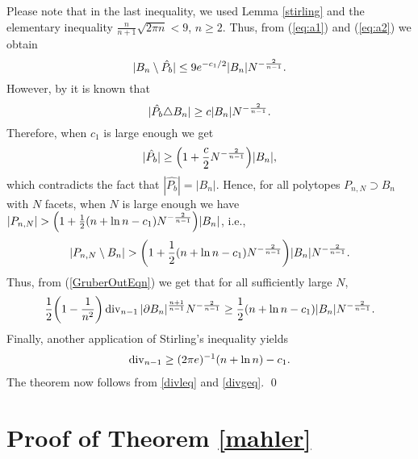 Please note that in the last inequality, we used Lemma \ref{stirling} and the elementary inequality $\frac{n}{n+1}\sqrt{2\pi n}<9$, $n\geq 2$. Thus, from (\ref{eq:a1}) and (\ref{eq:a2}) we obtain
\[
|B_n \setminus \hat{P_b}| %
\leq 9e^{-c_1/2}|B_n|\NN.
\] 
However, by \cite[Theorem 2]{Lud06} it is known that
\[
|\hat{P_b} \triangle B_n| \geq c|B_n|N^{-\frac 2{n-1}}.
\]
Therefore, when $ c_1 $ is large enough we get
\[
|\hat{P_b}| \geq \left(1+\frac{c}{2}\NN\right)|B_n|,
\]
which contradicts the fact that $ |\hat{P_b}| = |B_n|. $ Hence, for all polytopes $P_{n,N}\supset B_n$ with $N$ facets, when $N$ is large enough we have $|P_{n,N}| > \left(1+\tfrac{1}{2}(n+\ln n- c_1)\NN\right)|B_n|$, i.e., 
\[
|P_{n,N}\setminus B_n| > \left(1+\frac{1}{2}(n+\ln n- c_1)\NN\right)|B_n|\NN. 
\]
Thus, from (\ref{GruberOutEqn}) we get that for all sufficiently large $N$,
\[
\frac{1}{2}\left(1-\frac{1}{n^2}\right)\divv_{n-1}|\partial B_n|^{\frac{n+1}{n-1}}\NN \geq \frac{1}{2}(n+\ln n-c_1)|B_n|\NN.
\]
Finally, another application of Stirling's inequality yields
\begin{align}\label{divgeq}
\operatorname{div}_{n-1} \geq (2\pi e)^{-1}(n+\ln n) -c_1.
\end{align}
The theorem now follows from \eqref{divleq} and \eqref{divgeq}. \qed
\section{Proof of Theorem \ref{mahler}}\label{mahlerproof1}

